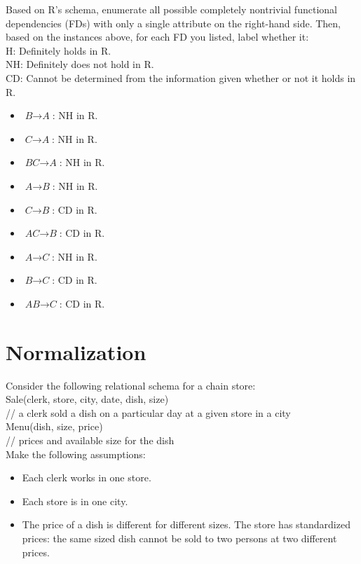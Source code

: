 \documentclass[paper=a4, fontsize=11pt]{scrartcl}
\numberwithin{equation}{section}		%
\numberwithin{figure}{section}			%
\numberwithin{table}{section}				%
\begin{document}
Based on R's schema, enumerate all possible completely nontrivial functional dependencies (FDs) with only a single attribute on the right-hand side. Then, based on the instances above, for each FD you listed, label whether it:\\
H: Definitely holds in R.\\
NH: Definitely does not hold in R.\\
CD: Cannot be determined from the information given whether or not it holds in R.
\begin{itemize}
\item $\textit{B} \rightarrow \textit{A}$: NH in R.
\item $\textit{C} \rightarrow \textit{A}$: NH in R.
\item $\textit{BC} \rightarrow \textit{A}$: NH in R.

\item $\textit{A} \rightarrow \textit{B}$: NH in R.
\item $\textit{C} \rightarrow \textit{B}$: CD in R.
\item $\textit{AC} \rightarrow \textit{B}$: CD in R.

\item $\textit{A} \rightarrow \textit{C}$: NH in R.
\item $\textit{B} \rightarrow \textit{C}$: CD in R.
\item $\textit{AB} \rightarrow \textit{C}$: CD in R.
\end{itemize}


\section{Normalization}
Consider the following relational schema for a chain store:\\
Sale(clerk, store, city, date, dish, size)\\
// a clerk sold a dish on a particular day at a given store in a city\\
Menu(dish, size, price)\\
// prices and available size for the dish\\

Make the following assumptions:
\begin{itemize}
\item Each clerk works in one store.
\item Each store is in one city.
\item The price of a dish is different for different sizes. The store has standardized prices:
the same sized dish cannot be sold to two persons at two different prices.
\end{itemize}
\end{document}
